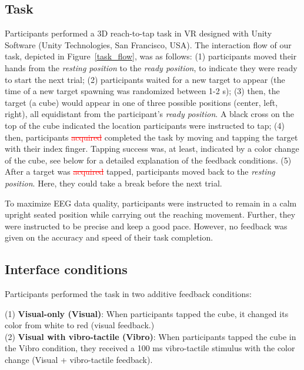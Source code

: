 \subsection{Task}
Participants performed a 3D reach-to-tap task in VR designed with Unity Software (Unity Technologies, San Francisco, USA). The interaction flow of our task, depicted in Figure~\ref{task_flow}, was as follows: (1) participants moved their hands from the \textit{resting position} to the \textit{ready position}, to indicate they were ready to start the next trial; (2) participants waited for a new target to appear (the time of a new target spawning was randomized between 1-2 s); (3) then, the target (a cube) would appear in one of three possible positions (center, left, right), all equidistant from the participant's \textit{ready position}. \textcolor{n}{A black cross on the top of the cube indicated the location participants were instructed to tap};
(4) then, participants \textcolor{red}{\st{acquired}} \textcolor{n}{completed} the task by moving and tapping the target with their index finger. \textcolor{n}{Tapping success was, at least, indicated by a color change of the cube, see below for a detailed explanation of the feedback conditions.} (5) After a target was \textcolor{red}{\st{acquired}} \textcolor{n}{tapped}, participants moved back to the \textit{resting position}. Here, they could take a break before the next trial.

\textcolor{n}{To maximize EEG data quality, participants were instructed to remain in a calm upright seated position while carrying out the reaching movement. Further, they were instructed to be precise and keep a good pace. However, no feedback was given on the accuracy and speed of their task completion.}

\subsection{Interface conditions}
Participants performed the task in two additive feedback conditions:

(1) \textbf{Visual-only (Visual)}: When participants tapped the cube, it changed its color from white to red (visual feedback.)\\
\indent(2) \textbf{Visual with vibro-tactile (Vibro)}: When participants tapped the cube in the Vibro condition, they received a 100 ms vibro-tactile stimulus with the color change (Visual + vibro-tactile feedback).

